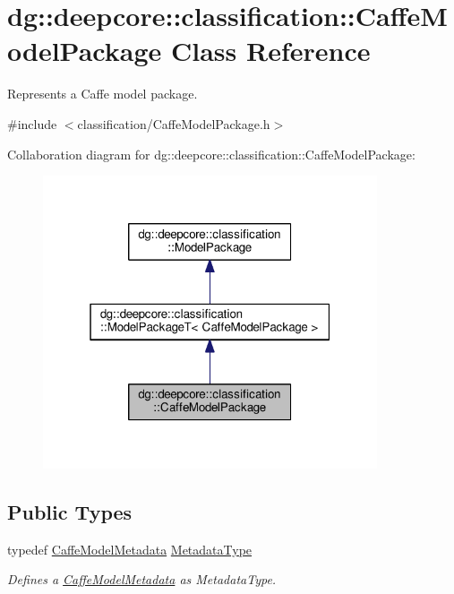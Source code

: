 \hypertarget{classdg_1_1deepcore_1_1classification_1_1_caffe_model_package}{}\section{dg\+:\+:deepcore\+:\+:classification\+:\+:Caffe\+Model\+Package Class Reference}
\label{classdg_1_1deepcore_1_1classification_1_1_caffe_model_package}


Represents a Caffe model package.  




{\ttfamily \#include $<$classification/\+Caffe\+Model\+Package.\+h$>$}



Collaboration diagram for dg\+:\+:deepcore\+:\+:classification\+:\+:Caffe\+Model\+Package\+:
\nopagebreak
\begin{figure}[H]
\begin{center}
\leavevmode
\includegraphics[width=280pt]{classdg_1_1deepcore_1_1classification_1_1_caffe_model_package__coll__graph}
\end{center}
\end{figure}
\subsection*{Public Types}
\begin{DoxyCompactItemize}
\item 
typedef \hyperlink{structdg_1_1deepcore_1_1classification_1_1_caffe_model_metadata}{Caffe\+Model\+Metadata} \hyperlink{group___classification_module_gae0f23f2d134e0b3fc83b807077e32e8b}{Metadata\+Type}
\begin{DoxyCompactList}\small\item\em Defines a \hyperlink{structdg_1_1deepcore_1_1classification_1_1_caffe_model_metadata}{Caffe\+Model\+Metadata} as Metadata\+Type. \end{DoxyCompactList}\end{DoxyCompactItemize}
